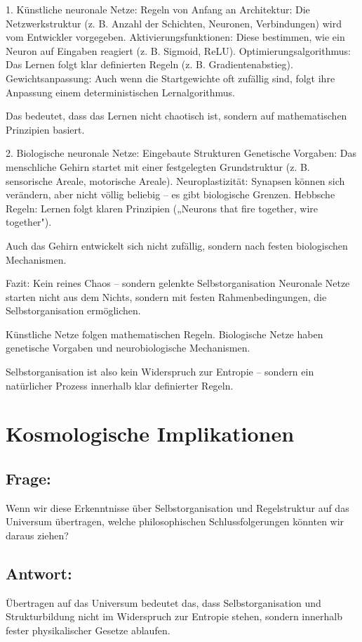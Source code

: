 \documentclass{article}
\begin{document}
	1. Künstliche neuronale Netze: Regeln von Anfang an
	Architektur: Die Netzwerkstruktur (z. B. Anzahl der Schichten, Neuronen, Verbindungen) wird vom Entwickler vorgegeben.
	Aktivierungsfunktionen: Diese bestimmen, wie ein Neuron auf Eingaben reagiert (z. B. Sigmoid, ReLU).
	Optimierungsalgorithmus: Das Lernen folgt klar definierten Regeln (z. B. Gradientenabstieg).
	Gewichtsanpassung: Auch wenn die Startgewichte oft zufällig sind, folgt ihre Anpassung einem deterministischen Lernalgorithmus.
	
	Das bedeutet, dass das Lernen nicht chaotisch ist, sondern auf mathematischen Prinzipien basiert.
	
	2. Biologische neuronale Netze: Eingebaute Strukturen
	Genetische Vorgaben: Das menschliche Gehirn startet mit einer festgelegten Grundstruktur (z. B. sensorische Areale, motorische Areale).
	Neuroplastizität: Synapsen können sich verändern, aber nicht völlig beliebig – es gibt biologische Grenzen.
	Hebbsche Regeln: Lernen folgt klaren Prinzipien („Neurons that fire together, wire together").
	
	Auch das Gehirn entwickelt sich nicht zufällig, sondern nach festen biologischen Mechanismen.
	
	Fazit: Kein reines Chaos – sondern gelenkte Selbstorganisation
	Neuronale Netze starten nicht aus dem Nichts, sondern mit festen Rahmenbedingungen, die Selbstorganisation ermöglichen.
	
	Künstliche Netze folgen mathematischen Regeln.
	Biologische Netze haben genetische Vorgaben und neurobiologische Mechanismen.
	
	Selbstorganisation ist also kein Widerspruch zur Entropie – sondern ein natürlicher Prozess innerhalb klar definierter Regeln.
	
	\section{Kosmologische Implikationen}
	
	\subsection*{Frage:}
	Wenn wir diese Erkenntnisse über Selbstorganisation und Regelstruktur auf das Universum übertragen, welche philosophischen Schlussfolgerungen könnten wir daraus ziehen?
	
	\subsection*{Antwort:}
	Übertragen auf das Universum bedeutet das, dass Selbstorganisation und Strukturbildung nicht im Widerspruch zur Entropie stehen, sondern innerhalb fester physikalischer Gesetze ablaufen.
	
\end{document}
